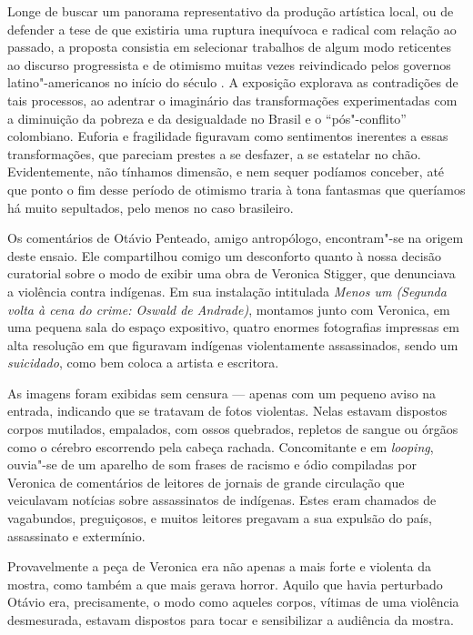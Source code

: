 Longe de buscar um panorama representativo da produção artística local,
ou de defender a tese de que existiria uma ruptura inequívoca e radical
com relação ao passado, a proposta consistia em selecionar trabalhos de
algum modo reticentes ao discurso progressista e de otimismo muitas
vezes reivindicado pelos governos latino"-americanos no início do século
. A exposição explorava as contradições de tais processos, ao adentrar
o imaginário das transformações experimentadas com a diminuição da
pobreza e da desigualdade no Brasil e o ``pós"-conflito'' colombiano.
Euforia e fragilidade figuravam como sentimentos inerentes a essas
transformações, que pareciam prestes a se desfazer, a se estatelar no
chão. Evidentemente, não tínhamos dimensão, e nem sequer podíamos
conceber, até que ponto o fim desse período de otimismo traria à tona
fantasmas que queríamos há muito sepultados, pelo menos no caso
brasileiro.

Os comentários de Otávio Penteado, amigo antropólogo, encontram"-se na origem deste ensaio. Ele compartilhou comigo um desconforto quanto à nossa decisão
curatorial sobre o modo de exibir uma obra de Veronica Stigger, que denunciava a violência contra indígenas. Em sua instalação intitulada \emph{Menos um (Segunda
volta à cena do crime: Oswald de Andrade)}, montamos junto com Veronica,
em uma pequena sala do espaço expositivo, quatro enormes fotografias
impressas em alta resolução em que figuravam indígenas
violentamente assassinados, sendo um \emph{suicidado}, como bem coloca a
artista e escritora.

As imagens foram exibidas sem censura --- apenas com um pequeno aviso na
entrada, indicando que se tratavam de fotos violentas. Nelas estavam
dispostos corpos mutilados, empalados, com ossos quebrados, repletos de
sangue ou órgãos como o cérebro escorrendo pela cabeça rachada.
Concomitante e em \emph{looping}, ouvia"-se de um aparelho de som frases
de racismo e ódio compiladas por Veronica de comentários de leitores de
jornais de grande circulação que veiculavam notícias sobre assassinatos
de indígenas. Estes eram chamados de vagabundos, preguiçosos, e muitos
leitores pregavam a sua expulsão do país, assassinato e extermínio.

Provavelmente a peça de Veronica era não apenas a mais forte e
violenta da mostra, como também a que mais gerava horror. Aquilo que
havia perturbado Otávio era, precisamente, o modo como
aqueles corpos, vítimas de uma violência desmesurada, estavam dispostos
para tocar e sensibilizar a audiência da mostra.


